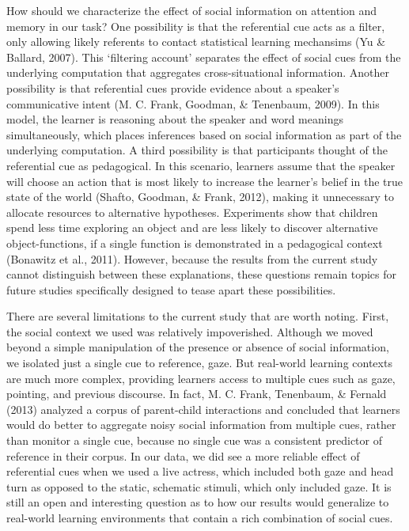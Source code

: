 \documentclass[12pt,]{article}
\begin{document}
How should we characterize the effect of social information on attention
and memory in our task? One possibility is that the referential cue acts
as a filter, only allowing likely referents to contact statistical
learning mechansims (Yu \& Ballard, 2007). This `filtering account'
separates the effect of social cues from the underlying computation that
aggregates cross-situational information. Another possibility is that
referential cues provide evidence about a speaker's communicative intent
(M. C. Frank, Goodman, \& Tenenbaum, 2009). In this model, the learner
is reasoning about the speaker and word meanings simultaneously, which
places inferences based on social information as part of the underlying
computation. A third possibility is that participants thought of the
referential cue as pedagogical. In this scenario, learners assume that
the speaker will choose an action that is most likely to increase the
learner's belief in the true state of the world (Shafto, Goodman, \&
Frank, 2012), making it unnecessary to allocate resources to alternative
hypotheses. Experiments show that children spend less time exploring an
object and are less likely to discover alternative object-functions, if
a single function is demonstrated in a pedagogical context (Bonawitz et
al., 2011). However, because the results from the current study cannot
distinguish between these explanations, these questions remain topics
for future studies specifically designed to tease apart these
possibilities.

There are several limitations to the current study that are worth
noting. First, the social context we used was relatively impoverished.
Although we moved beyond a simple manipulation of the presence or
absence of social information, we isolated just a single cue to
reference, gaze. But real-world learning contexts are much more complex,
providing learners access to multiple cues such as gaze, pointing, and
previous discourse. In fact, M. C. Frank, Tenenbaum, \& Fernald (2013)
analyzed a corpus of parent-child interactions and concluded that
learners would do better to aggregate noisy social information from
multiple cues, rather than monitor a single cue, because no single cue
was a consistent predictor of reference in their corpus. In our data, we
did see a more reliable effect of referential cues when we used a live
actress, which included both gaze and head turn as opposed to the
static, schematic stimuli, which only included gaze. It is still an open
and interesting question as to how our results would generalize to
real-world learning environments that contain a rich combination of
social cues.
\end{document}
